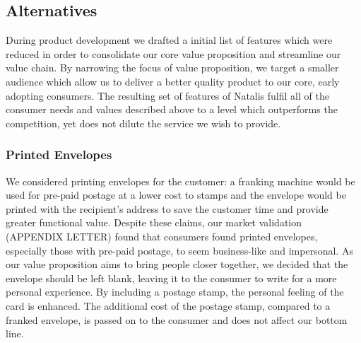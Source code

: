 \documentclass[10pt,a4paper]{article}
\begin{document}
\subsection*{Alternatives}
During product development we drafted a initial list of features which were reduced in order to consolidate our core value proposition and streamline our value chain. By narrowing the focus of value proposition, we target a smaller audience which allow us to deliver a better quality product to our core, early adopting consumers. The resulting set of features of Natalis fulfil all of the consumer needs and values described above to a level which outperforms the competition, yet does not dilute the service we wish to provide.

\subsubsection*{Printed Envelopes}
We considered printing envelopes for the customer: a franking machine would be used for pre-paid postage at a lower cost to stamps and the envelope would be printed with the recipient's address to save the customer time and provide greater functional value. Despite these claims, our market validation (APPENDIX LETTER) found that consumers found printed envelopes, especially those with pre-paid postage, to seem business-like and impersonal. As our value proposition aims to bring people closer together, we decided that the envelope should be left blank, leaving it to the consumer to write for a more personal experience. By including a postage stamp, the personal feeling of the card is enhanced. The additional cost of the postage stamp, compared to a franked envelope, is passed on to the consumer and does not affect our bottom line.
\end{document}
